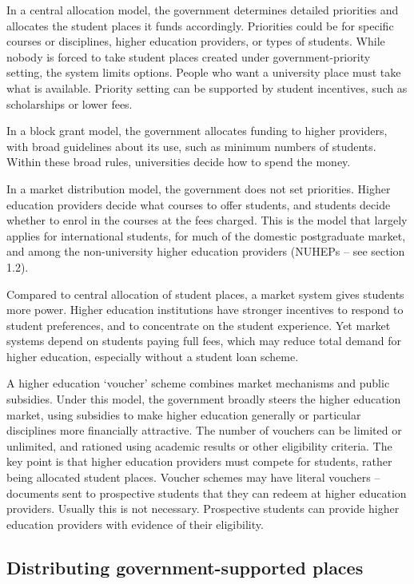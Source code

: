 \documentclass[]{book}
\begin{document}
In a central allocation model, the government determines detailed priorities and allocates the student places it funds accordingly. Priorities could be for specific courses or disciplines, higher education providers, or types of students. While nobody is forced to take student places created under government-priority setting, the system limits options. People who want a university place must take what is available. Priority setting can be supported by student incentives, such as scholarships or lower fees.

In a block grant model, the government allocates funding to higher providers, with broad guidelines about its use, such as minimum numbers of students. Within these broad rules, universities decide how to spend the money.

In a market distribution model, the government does not set priorities. Higher education providers decide what courses to offer students, and students decide whether to enrol in the courses at the fees charged. This is the model that largely applies for international students, for much of the domestic postgraduate market, and among the non-university higher education providers (NUHEPs -- see section 1.2).

Compared to central allocation of student places, a market system gives students more power. Higher education institutions have stronger incentives to respond to student preferences, and to concentrate on the student experience. Yet market systems depend on students paying full fees, which may reduce total demand for higher education, especially without a student loan scheme.

A higher education `voucher' scheme combines market mechanisms and public subsidies. Under this model, the government broadly steers the higher education market, using subsidies to make higher education generally or particular disciplines more financially attractive. The number of vouchers can be limited or unlimited, and rationed using academic results or other eligibility criteria. The key point is that higher education providers must compete for students, rather being allocated student places. Voucher schemes may have literal vouchers -- documents sent to prospective students that they can redeem at higher education providers. Usually this is not necessary. Prospective students can provide higher education providers with evidence of their eligibility.

\hypertarget{distributing-government-supported-places}{%
\subsection{Distributing government-supported places}\label{distributing-government-supported-places}}
\end{document}
